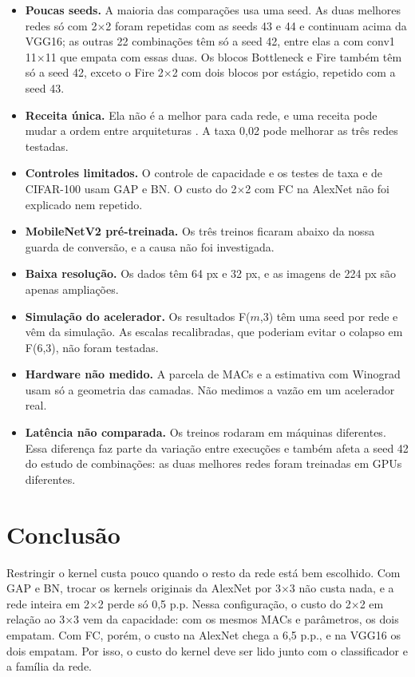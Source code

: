 \documentclass[conference]{IEEEtran}
\newcommand{\by}{\ensuremath{\times}}
\begin{document}
\begin{itemize}
\item \textbf{Poucas seeds.} A maioria das comparações usa uma seed. As duas melhores redes só com 2\by2 foram repetidas com as seeds 43 e 44 e continuam acima da VGG16; as outras 22 combinações têm só a seed 42, entre elas a com conv1 11\by11 que empata com essas duas. Os blocos Bottleneck e Fire também têm só a seed 42, exceto o Fire 2\by2 com dois blocos por estágio, repetido com a seed 43.
\item \textbf{Receita única.} Ela não é a melhor para cada rede, e uma receita pode mudar a ordem entre arquiteturas \cite{bello2021revisiting,wightman2021resnet}. A taxa 0,02 pode melhorar as três redes testadas.
\item \textbf{Controles limitados.} O controle de capacidade e os testes de taxa e de CIFAR-100 usam GAP e BN. O custo do 2\by2 com FC na AlexNet não foi explicado nem repetido.
\item \textbf{MobileNetV2 pré-treinada.} Os três treinos ficaram abaixo da nossa guarda de conversão, e a causa não foi investigada.
\item \textbf{Baixa resolução.} Os dados têm 64 px e 32 px, e as imagens de 224 px são apenas ampliações.
\item \textbf{Simulação do acelerador.} Os resultados F($m$,3) têm uma seed por rede e vêm da simulação. As escalas recalibradas, que poderiam evitar o colapso em F(6,3), não foram testadas.
\item \textbf{Hardware não medido.} A parcela de MACs e a estimativa com Winograd usam só a geometria das camadas. Não medimos a vazão em um acelerador real.
\item \textbf{Latência não comparada.} Os treinos rodaram em máquinas diferentes. Essa diferença faz parte da variação entre execuções e também afeta a seed 42 do estudo de combinações: as duas melhores redes foram treinadas em GPUs diferentes.
\end{itemize}

\section{Conclusão}

Restringir o kernel custa pouco quando o resto da rede está bem escolhido. Com GAP e BN, trocar os kernels originais da AlexNet por 3\by3 não custa nada, e a rede inteira em 2\by2 perde só 0,5 p.p. Nessa configuração, o custo do 2\by2 em relação ao 3\by3 vem da capacidade: com os mesmos MACs e parâmetros, os dois empatam. Com FC, porém, o custo na AlexNet chega a 6,5 p.p., e na VGG16 os dois empatam. Por isso, o custo do kernel
deve ser lido junto com o classificador e a família da rede.
\end{document}
